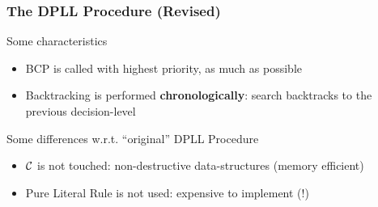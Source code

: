 \begin{frame}
  \frametitle{The DPLL Procedure (Revised)}

  Some characteristics

  \begin{itemize}
    \vfill
    \item BCP is called with highest priority, as much as possible
    \vfill
    \item Backtracking is performed {\bf chronologically}: search backtracks to
          the previous decision-level
    \vfill
  \end{itemize}

  \pause
  Some differences w.r.t. ``original'' DPLL Procedure

  \begin{itemize}
    \vfill 
    \item $\mathcal{C}$ is not touched: non-destructive data-structures (memory efficient)
    \vfill 
    \item Pure Literal Rule is not used: expensive to implement (!)
  \end{itemize}

\end{frame}
